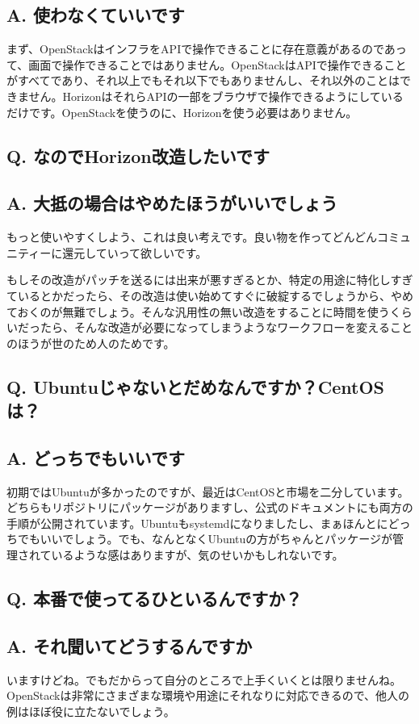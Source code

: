 \documentclass[9pt,b5paper,tombo,openany]{jsbook}
\begin{document}
\subsection*{A. 使わなくていいです}
まず、OpenStackはインフラをAPIで操作できることに存在意義があるのであって、画面で操作できることではありません。OpenStackはAPIで操作できることがすべてであり、それ以上でもそれ以下でもありませんし、それ以外のことはできません。HorizonはそれらAPIの一部をブラウザで操作できるようにしているだけです。OpenStackを使うのに、Horizonを使う必要はありません。

\subsection*{Q. なのでHorizon改造したいです}
\subsection*{A. 大抵の場合はやめたほうがいいでしょう}
もっと使いやすくしよう、これは良い考えです。良い物を作ってどんどんコミュニティーに還元していって欲しいです。

もしその改造がパッチを送るには出来が悪すぎるとか、特定の用途に特化しすぎているとかだったら、その改造は使い始めてすぐに破綻するでしょうから、やめておくのが無難でしょう。そんな汎用性の無い改造をすることに時間を使うくらいだったら、そんな改造が必要になってしまうようなワークフローを変えることのほうが世のため人のためです。

\subsection*{Q. Ubuntuじゃないとだめなんですか？CentOSは？}
\subsection*{A. どっちでもいいです}
初期ではUbuntuが多かったのですが、最近はCentOSと市場を二分しています。どちらもリポジトリにパッケージがありますし、公式のドキュメントにも両方の手順が公開されています。Ubuntuもsystemdになりましたし、まぁほんとにどっちでもいいでしょう。でも、なんとなくUbuntuの方がちゃんとパッケージが管理されているような感はありますが、気のせいかもしれないです。

\subsection*{Q. 本番で使ってるひといるんですか？}
\subsection*{A. それ聞いてどうするんですか}
いますけどね。でもだからって自分のところで上手くいくとは限りませんね。OpenStackは非常にさまざまな環境や用途にそれなりに対応できるので、他人の例はほぼ役に立たないでしょう。
\end{document}
